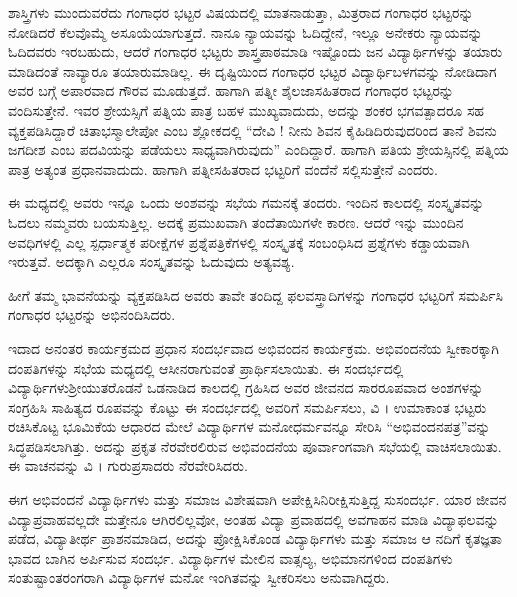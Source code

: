 {ಶಾಸ್ತ್ರಿಗಳು ಮುಂದುವರೆದು ಗಂಗಾಧರ ಭಟ್ಟರ ವಿಷಯದಲ್ಲಿ ಮಾತನಾಡುತ್ತಾ, \enginline{-} ಮಿತ್ರರಾದ ಗಂಗಾಧರ ಭಟ್ಟರನ್ನು ನೋಡಿದರೆ ಕೆಲವೊಮ್ಮೆ ಅಸೂಯೆಯಾ\-ಗುತ್ತದೆ. ನಾನೂ ನ್ಯಾಯವನ್ನು ಓದಿದ್ದೇನೆ, ಇಲ್ಲೂ ಅನೇಕರು ನ್ಯಾಯವನ್ನು ಓದಿದವರು ಇರಬಹುದು, ಆದರೆ ಗಂಗಾಧರ ಭಟ್ಟರು ಶಾಸ್ತ್ರಪಾಠಮಾಡಿ ಇಷ್ಟೊಂದು ಜನ ವಿದ್ಯಾರ್ಥಿಗಳನ್ನು ತಯಾರು ಮಾಡಿದಂತೆ ನಾವ್ಯಾರೂ ತಯಾರುಮಾಡಿಲ್ಲ. ಈ ದೃಷ್ಟಿಯಿಂದ ಗಂಗಾಧರ ಭಟ್ಟರ ವಿದ್ಯಾರ್ಥಿಬಳಗವನ್ನು ನೋಡಿದಾಗ ಅವರ ಬಗ್ಗೆ ಅಪಾರವಾದ ಗೌರವ ಮೂಡುತ್ತದೆ. ಹಾಗಾಗಿ ಪತ್ನೀ\enginline{-} ಶೈಲಜಾಸಹಿತರಾದ ಗಂಗಾಧರ ಭಟ್ಟರನ್ನು ವಂದಿಸುತ್ತೇನೆ. ಇವರ ಶ್ರೇಯಸ್ಸಿಗೆ ಪತ್ನಿಯ ಪಾತ್ರ ಬಹಳ ಮುಖ್ಯ\-ವಾದುದು, ಅದನ್ನು ಶಂಕರ ಭಗವತ್ಪಾದರೂ ಸಹ ವ್ಯಕ್ತಪಡಿಸಿದ್ದಾರೆ \enginline{-}ಚಿತಾಭಸ್ಮಾಲೇಪೋ ಎಂಬ ಶ್ಲೋಕದಲ್ಲಿ \enginline{-} “ದೇವಿ ! ನೀನು ಶಿವನ ಕೈಹಿಡಿದಿರುವುದರಿಂದ ತಾನೆ ಶಿವನು ಜಗದೀಶ ಎಂಬ ಪದವಿಯನ್ನು ಪಡೆಯಲು ಸಾಧ್ಯವಾಗಿರುವುದು” ಎಂದಿದ್ದಾರೆ. ಹಾಗಾಗಿ ಪತಿಯ ಶ್ರೇಯಸ್ಸಿನಲ್ಲಿ ಪತ್ನಿಯ ಪಾತ್ರ ಅತ್ಯಂತ ಪ್ರಧಾನವಾದುದು. ಹಾಗಾಗಿ ಪತ್ನೀ\-ಸಹಿತರಾದ ಭಟ್ಟರಿಗೆ ವಂದೆನೆ ಸಲ್ಲಿಸುತ್ತೇನೆ ಎಂದರು.

ಈ ಮಧ್ಯದಲ್ಲಿ ಅವರು ಇನ್ನೂ ಒಂದು ಅಂಶವನ್ನು ಸಭೆಯ ಗಮನಕ್ಕೆ ತಂದರು. ಇಂದಿನ ಕಾಲದಲ್ಲಿ ಸಂಸ್ಕೃತವನ್ನು ಓದಲು ನಮ್ಮವರು ಬಯಸುತ್ತಿಲ್ಲ. ಅದಕ್ಕೆ ಪ್ರಮುಖವಾಗಿ ತಂದೆತಾಯಿಗಳೇ ಕಾರಣ. ಆದರೆ ಇನ್ನು ಮುಂದಿನ ಅವಧಿಗಳಲ್ಲಿ ಎಲ್ಲ ಸ್ಪರ್ಧಾತ್ಮಕ ಪರೀಕ್ಷೆಗಳ ಪ್ರಶ್ನೆಪತ್ರಿಕೆಗಳಲ್ಲಿ ಸಂಸ್ಕೃತಕ್ಕೆ ಸಂಬಂಧಿಸಿದ ಪ್ರಶ್ನೆಗಳು ಕಡ್ಡಾಯವಾಗಿ ಇರುತ್ತವೆ. ಅದಕ್ಕಾಗಿ ಎಲ್ಲರೂ ಸಂಸ್ಕೃತವನ್ನು ಓದುವುದು ಅತ್ಯವಶ್ಯ.  

ಹೀಗೆ ತಮ್ಮ ಭಾವನೆಯನ್ನು ವ್ಯಕ್ತಪಡಿಸಿದ ಅವರು ತಾವೇ ತಂದಿದ್ದ ಫಲವಸ್ತ್ರಾದಿ\-ಗಳನ್ನು ಗಂಗಾಧರ ಭಟ್ಟರಿಗೆ ಸಮರ್ಪಿಸಿ ಗಂಗಾಧರ ಭಟ್ಟರನ್ನು ಅಭಿನಂದಿಸಿದರು.

ಇದಾದ ಅನಂತರ ಕಾರ್ಯಕ್ರಮದ ಪ್ರಧಾನ ಸಂದರ್ಭವಾದ ಅಭಿವಂದನ ಕಾರ್ಯಕ್ರಮ. ಅಭಿವಂದನೆಯ ಸ್ವೀಕಾರಕ್ಕಾಗಿ ದಂಪತಿಗಳನ್ನು ಸಭೆಯ ಮಧ್ಯದಲ್ಲಿ ಆಸೀನರಾಗುವಂತೆ ಪ್ರಾರ್ಥಿಸಲಾಯಿತು. ಈ ಸಂದರ್ಭದಲ್ಲಿ ವಿದ್ಯಾರ್ಥಿಗಳು\break ಶ್ರೀಯುತ\-ರೊಡನೆ ಒಡನಾಡಿದ ಕಾಲದಲ್ಲಿ ಗ್ರಹಿಸಿದ ಅವರ ಜೀವನದ ಸಾರರೂಪವಾದ ಅಂಶಗಳನ್ನು ಸಂಗ್ರಹಿಸಿ ಸಾಹಿತ್ಯದ ರೂಪವನ್ನು ಕೊಟ್ಟು ಈ ಸಂದರ್ಭದಲ್ಲಿ ಅವರಿಗೆ ಸಮರ್ಪಿಸಲು, ವಿ । ಉಮಾಕಾಂತ ಭಟ್ಟರು ರಚಿಸಿಕೊಟ್ಟ ಭೂಮಿಕೆಯ ಆಧಾರದ ಮೇಲೆ ವಿದ್ಯಾರ್ಥಿಗಳ ಮನೋಧರ್ಮವನ್ನೂ ಸೇರಿಸಿ “ಅಭಿವಂದನಪತ್ರ”ವನ್ನು ಸಿದ್ಧ\break ಪಡಿಸಲಾಗಿತ್ತು. ಅದನ್ನು ಪ್ರಕೃತ ನೆರವೇರಲಿರುವ ಅಭಿವಂದನೆಯ \hbox{ಪೂರ್ವಾಂಗವಾಗಿ} ಸಭೆಯಲ್ಲಿ ವಾಚಿಸಲಾಯಿತು. ಈ ವಾಚನವನ್ನು ವಿ । ಗುರುಪ್ರಸಾದರು \hbox{ನೆರವೇರಿಸಿದರು.}

ಈಗ ಅಭಿವಂದನೆ \enginline{-} ವಿದ್ಯಾರ್ಥಿಗಳು ಮತ್ತು ಸಮಾಜ ವಿಶೇಷವಾಗಿ ಅಪೇಕ್ಷಿಸಿ\break ನಿರೀಕ್ಷಿಸುತ್ತಿದ್ದ ಸುಸಂದರ್ಭ. ಯಾರ ಜೀವನ ವಿದ್ಯಾಪ್ರವಾಹವಲ್ಲದೇ ಮತ್ತೇನೂ ಆಗಿರ\-ಲಿಲ್ಲವೋ, ಅಂತಹ ವಿದ್ಯಾ ಪ್ರವಾಹದಲ್ಲಿ ಅವಗಾಹನ ಮಾಡಿ ವಿದ್ಯಾಫಲವನ್ನು ಪಡೆದ, ವಿದ್ಯಾತೀರ್ಥ ಪ್ರಾಶನಮಾಡಿದ, ಅದನ್ನು ಪ್ರೋಕ್ಷಿಸಿಕೊಂಡ ವಿದ್ಯಾರ್ಥಿಗಳು ಮತ್ತು ಸಮಾಜ ಆ ನದಿಗೆ ಕೃತಜ್ಞತಾ ಭಾವದ ಬಾಗಿನ ಅರ್ಪಿಸುವ ಸಂದರ್ಭ. ವಿದ್ಯಾರ್ಥಿಗಳ ಮೇಲಿನ ವಾತ್ಸಲ್ಯ, ಅಭಿಮಾನಗಳಿಂದ ದಂಪತಿಗಳು ಸಂತುಷ್ಟಾಂತರಂಗ\-ರಾಗಿ ವಿದ್ಯಾರ್ಥಿಗಳ ಮನೋ ಇಂಗಿತವನ್ನು ಸ್ವೀಕರಿಸಲು ಅನುವಾಗಿದ್ದರು. 

}
